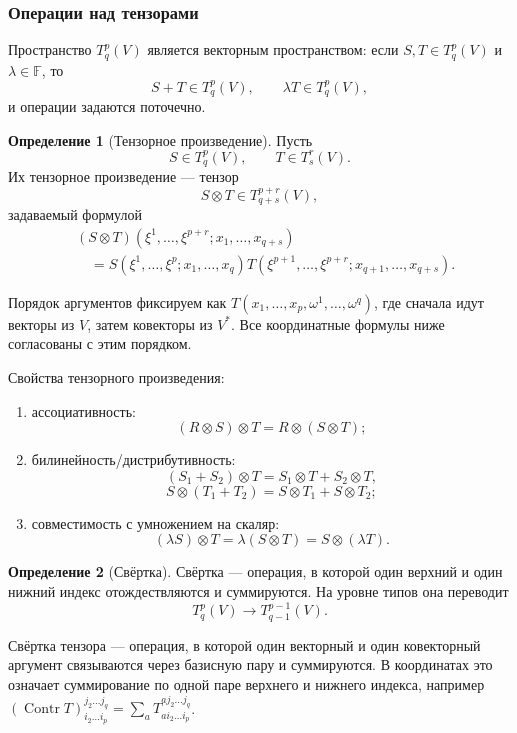 \documentclass[12pt,a4paper]{article}
\theoremstyle{definition}
\newtheorem{definition}{Определение}[section]
\theoremstyle{plain}
\theoremstyle{remark}
\newenvironment{knowledgefix}{\begin{clarifybox}}{\end{clarifybox}}
\newcommand{\F}{\mathbb{F}}
\begin{document}
\subsubsection*{Операции над тензорами}

Пространство $T^p_q(V)$ является векторным пространством: если $S,T\in T^p_q(V)$ и $\lambda\in\F$, то
\[
    S+T\in T^p_q(V),
    \qquad
    \lambda T\in T^p_q(V),
\]
и операции задаются поточечно.

\begin{definition}[Тензорное произведение]
Пусть
\[
    S\in T^p_q(V),
    \qquad
    T\in T^r_s(V).
\]
Их тензорное произведение --- тензор
\[
    S\otimes T\in T^{p+r}_{q+s}(V),
\]
задаваемый формулой
\[
\begin{aligned}
&(S\otimes T)(\xi^1,\ldots,\xi^{p+r};
                 x_1,\ldots,x_{q+s})\\
&\quad=
S(\xi^1,\ldots,\xi^p;
  x_1,\ldots,x_q)
T(\xi^{p+1},\ldots,\xi^{p+r};
  x_{q+1},\ldots,x_{q+s}).
\end{aligned}
\]
\begin{knowledgefix}
Порядок аргументов фиксируем как \(T(x_1,\ldots,x_p,\omega^1,\ldots,\omega^q)\), где сначала идут векторы из \(V\), затем ковекторы из \(V^*\). Все координатные формулы ниже согласованы с этим порядком.
\end{knowledgefix}
\end{definition}

Свойства тензорного произведения:
\begin{enumerate}[label=\arabic*)]
    \item ассоциативность:
    \[
        (R\otimes S)\otimes T=R\otimes(S\otimes T);
    \]
    \item билинейность/дистрибутивность:
    \[
        (S_1+S_2)\otimes T=S_1\otimes T+S_2\otimes T,
    \]
    \[
        S\otimes(T_1+T_2)=S\otimes T_1+S\otimes T_2;
    \]
    \item совместимость с умножением на скаляр:
    \[
        (\lambda S)\otimes T=\lambda(S\otimes T)=S\otimes(\lambda T).
    \]
\end{enumerate}

\begin{definition}[Свёртка]
Свёртка --- операция, в которой один верхний и один нижний индекс отождествляются и суммируются. На уровне типов она переводит
\[
    T^p_q(V)\longrightarrow T^{p-1}_{q-1}(V).
\]
\begin{knowledgefix}
Свёртка тензора — операция, в которой один векторный и один ковекторный аргумент связываются через базисную пару и суммируются. В координатах это означает суммирование по одной паре верхнего и нижнего индекса, например \((\operatorname{Contr}T)^{j_2\ldots j_q}_{i_2\ldots i_p}=\sum_a T^{a j_2\ldots j_q}_{a i_2\ldots i_p}\).
\end{knowledgefix}
\end{definition}
\end{document}
